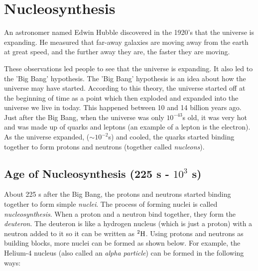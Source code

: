 



\section{Nucleosynthesis}
An astronomer named Edwin Hubble discovered in the 1920's that the universe is expanding. He measured that far-away galaxies are moving away from the earth at great speed, and the further away they are, the faster they are moving. 


These observations led people to see that the universe is expanding. It also led to the 'Big Bang' hypothesis. The 'Big Bang' hypothesis is an idea about how the universe may have started. According to this theory, the universe started off at the beginning of time as a point which then exploded and expanded into the universe we live in today. This happened between 10 and 14 billion years ago.\\

Just after the Big Bang, when the universe was only $10^{-43}$s old, it was very hot and was made up of quarks and leptons (an example of a lepton is the electron). As the universe expanded, ($\sim10^{-2}$s) and cooled, the quarks started binding together to form protons and neutrons (together called \emph{nucleons}). 

\subsection{Age of Nucleosynthesis (225 s - $10^{3}$ s)}
About 225 s after the Big Bang, the protons and neutrons started binding together to form simple \emph{nuclei}. The process of forming nuclei is called \emph{nucleosynthesis}. When a proton and a neutron bind together, they form the \emph{deuteron}. The deuteron is like a hydrogen nucleus (which is just a proton) with a neutron added to it so it can be written as $^{2}\rm{H}$. Using protons and neutrons as building blocks, more nuclei can be formed as shown below. For example, the Helium-4 nucleus (also called an \emph{alpha particle}) can be formed in the following ways:

